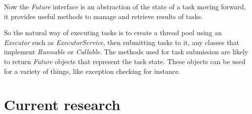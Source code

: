 Now the \emph{Future} interface is an abstraction of the state of a task moving forward, it provides useful methods to manage and retrieve results of tasks.

So the natural way of executing tasks is to create a thread pool using an \emph{Executor} such as \emph{ExecutorService}, then submitting tasks to it, any classes that implement \emph{Runnable} or \emph{Callable}. The methods used for task submission are likely to return \emph{Future} objects that represent the task state. These objects can be used for a variety of things, like exception checking for instance.

\section{Current research}